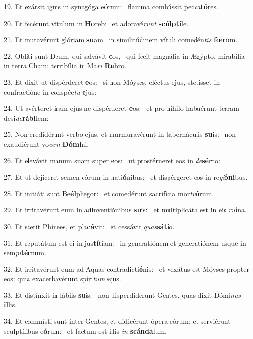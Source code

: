 19. Et exársit ignis in synagóga e\textbf{ó}rum: \ast\  flamma combússit pec\textit{ca}\textbf{tó}res.\

20. Et fecérunt vítulum in \textbf{Ho}reb: \ast\  et adoravé\textit{runt} \textbf{scúlp}\textbf{ti}le.\

21. Et mutavérunt glóriam \textbf{su}am \ast\  in similitúdinem vítuli comedén\textit{tis} \textbf{fœ}num.\

22. Oblíti sunt Deum, qui salvávit \textbf{e}os, \ast\  qui fecit magnália in Ægýpto, mirabília in terra Cham: terribília in Ma\textit{ri} \textbf{Ru}bro.\

23. Et dixit ut dispérderet \textbf{e}os: \ast\  si non Móyses, eléctus ejus, stetísset in confractióne in conspéc\textit{tu} \textbf{e}jus:\

24. Ut avérteret iram ejus ne dispérderet \textbf{e}os: \ast\  et pro níhilo habuérunt terram desi\textit{de}\textbf{rá}\textbf{bi}lem:\

25. Non credidérunt verbo ejus, et murmuravérunt in tabernáculis \textbf{su}is: \ast\  non exaudiérunt vo\textit{cem} \textbf{Dó}\textbf{mi}ni.\

26. Et elevávit manum suam super \textbf{e}os: \ast\  ut prostérneret eos in \textit{de}\textbf{sér}to:\

27. Et ut dejíceret semen eórum in nati\textbf{ó}nibus: \ast\  et dispérgeret eos in re\textit{gi}\textbf{ó}\textbf{ni}bus.\

28. Et initiáti sunt Be\textbf{él}phegor: \ast\  et comedérunt sacrifícia mor\textit{tu}\textbf{ó}rum.\

29. Et irritavérunt eum in adinventiónibus \textbf{su}is: \ast\  et multiplicáta est in eis \textit{ru}\textbf{í}na.\

30. Et stetit Phínees, et pla\textbf{cá}vit: \ast\  et cessávit \textit{quas}\textbf{sá}\textbf{ti}o.\

31. Et reputátum est ei in jus\textbf{tí}tiam: \ast\  in generatiónem et generatiónem usque in sem\textit{pi}\textbf{tér}num.\

32. Et irritavérunt eum ad Aquas contradicti\textbf{ó}nis: \ast\  et vexátus est Móyses propter eos: quia exacerbavérunt spíri\textit{tum} \textbf{e}jus.\

33. Et distínxit in lábiis \textbf{su}is: \ast\  non disperdidérunt Gentes, quas dixit Dómi\textit{nus} \textbf{il}lis.\

34. Et commísti sunt inter Gentes, et didicérunt ópera eórum: et serviérunt sculptílibus e\textbf{ó}rum: \ast\  et factum est illis \textit{in} \textbf{scán}\textbf{da}lum.\

